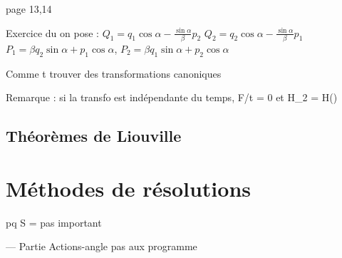 \documentclass[french]{yLectureNote}
\begin{document}
page 13,14

Exercice du on pose : $Q_1 = q_1 \cos \alpha - \frac{\sin \alpha}{\beta}p_2$
$Q_2 = q_2 \cos \alpha - \frac{\sin \alpha}{\beta}p_1$
$P_1 = \beta q_2\sin \alpha +p_1\cos \alpha $, $P_2 = \beta q_1\sin \alpha +p_2\cos \alpha$

Comme t trouver des transformations canoniques 

Remarque : si la transfo est indépendante du temps, \partial F/\partial t = 0 et H_2 = H()

\section{Théorèmes de Liouville}

\chapter{Méthodes de résolutions}
pq S = pas important


--- Partie Actions-angle pas aux programme
\end{document}
